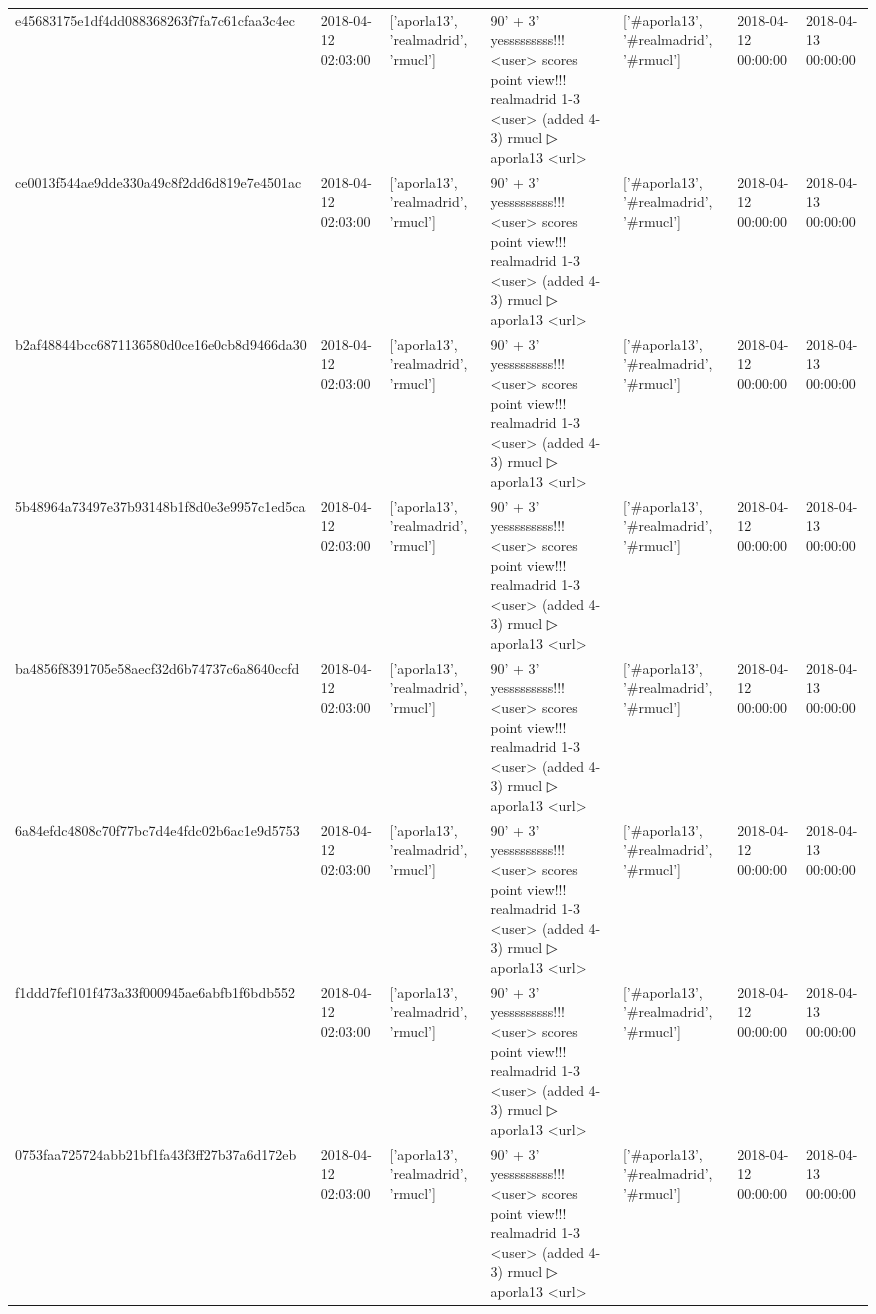 \begin{tabular}{lllllll}
e45683175e1df4dd088368263f7fa7c61cfaa3c4ec & 2018-04-12 02:03:00 & ['aporla13', 'realmadrid', 'rmucl'] & 90' + 3' yesssssssss!!! <user> scores point view!!! realmadrid 1-3 <user> (added 4-3) rmucl ▷ aporla13 <url> & ['#aporla13', '#realmadrid', '#rmucl'] & 2018-04-12 00:00:00 & 2018-04-13 00:00:00 \\
ce0013f544ae9dde330a49c8f2dd6d819e7e4501ac & 2018-04-12 02:03:00 & ['aporla13', 'realmadrid', 'rmucl'] & 90' + 3' yesssssssss!!! <user> scores point view!!! realmadrid 1-3 <user> (added 4-3) rmucl ▷ aporla13 <url> & ['#aporla13', '#realmadrid', '#rmucl'] & 2018-04-12 00:00:00 & 2018-04-13 00:00:00 \\
b2af48844bcc6871136580d0ce16e0cb8d9466da30 & 2018-04-12 02:03:00 & ['aporla13', 'realmadrid', 'rmucl'] & 90' + 3' yesssssssss!!! <user> scores point view!!! realmadrid 1-3 <user> (added 4-3) rmucl ▷ aporla13 <url> & ['#aporla13', '#realmadrid', '#rmucl'] & 2018-04-12 00:00:00 & 2018-04-13 00:00:00 \\
5b48964a73497e37b93148b1f8d0e3e9957c1ed5ca & 2018-04-12 02:03:00 & ['aporla13', 'realmadrid', 'rmucl'] & 90' + 3' yesssssssss!!! <user> scores point view!!! realmadrid 1-3 <user> (added 4-3) rmucl ▷ aporla13 <url> & ['#aporla13', '#realmadrid', '#rmucl'] & 2018-04-12 00:00:00 & 2018-04-13 00:00:00 \\
ba4856f8391705e58aecf32d6b74737c6a8640ccfd & 2018-04-12 02:03:00 & ['aporla13', 'realmadrid', 'rmucl'] & 90' + 3' yesssssssss!!! <user> scores point view!!! realmadrid 1-3 <user> (added 4-3) rmucl ▷ aporla13 <url> & ['#aporla13', '#realmadrid', '#rmucl'] & 2018-04-12 00:00:00 & 2018-04-13 00:00:00 \\
6a84efdc4808c70f77bc7d4e4fdc02b6ac1e9d5753 & 2018-04-12 02:03:00 & ['aporla13', 'realmadrid', 'rmucl'] & 90' + 3' yesssssssss!!! <user> scores point view!!! realmadrid 1-3 <user> (added 4-3) rmucl ▷ aporla13 <url> & ['#aporla13', '#realmadrid', '#rmucl'] & 2018-04-12 00:00:00 & 2018-04-13 00:00:00 \\
f1ddd7fef101f473a33f000945ae6abfb1f6bdb552 & 2018-04-12 02:03:00 & ['aporla13', 'realmadrid', 'rmucl'] & 90' + 3' yesssssssss!!! <user> scores point view!!! realmadrid 1-3 <user> (added 4-3) rmucl ▷ aporla13 <url> & ['#aporla13', '#realmadrid', '#rmucl'] & 2018-04-12 00:00:00 & 2018-04-13 00:00:00 \\
0753faa725724abb21bf1fa43f3ff27b37a6d172eb & 2018-04-12 02:03:00 & ['aporla13', 'realmadrid', 'rmucl'] & 90' + 3' yesssssssss!!! <user> scores point view!!! realmadrid 1-3 <user> (added 4-3) rmucl ▷ aporla13 <url> & ['#aporla13', '#realmadrid', '#rmucl'] & 2018-04-12 00:00:00 & 2018-04-13 00:00:00 \\

\end{tabular}
